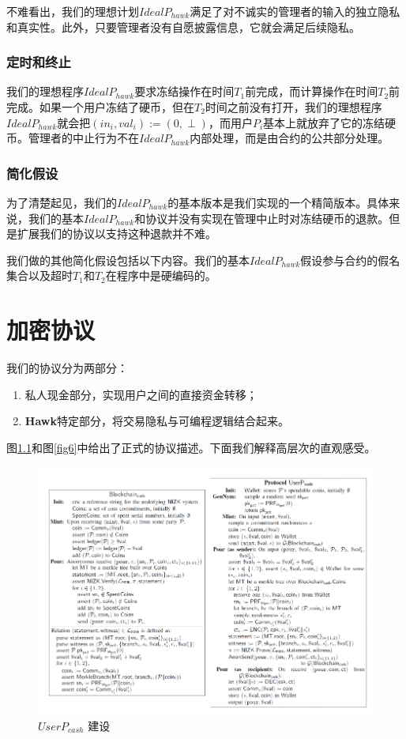 \documentclass{xduugtrans}
\begin{document}
不难看出，我们的理想计划$IdealP_{hawk}$满足了对不诚实的管理者的输入的独立隐私和真实性。此外，只要管理者没有自愿披露信息，它就会满足后续隐私。

\subsection{定时和终止}

我们的理想程序$IdealP_{hawk}$要求冻结操作在时间$T_1$前完成，而计算操作在时间$T_2$前完成。如果一个用户冻结了硬币，但在$T_2$时间之前没有打开，我们的理想程序$IdealP_{hawk}$就会把$(in_i,val_i) := (0, \perp )$，而用户$P_i$基本上就放弃了它的冻结硬币。管理者的中止行为不在$IdealP_{hawk}$内部处理，而是由合约的公共部分处理。

\subsection{简化假设}

为了清楚起见，我们的$IdealP_{hawk}$的基本版本是我们实现的一个精简版本。具体来说，我们的基本$IdealP_{hawk}$和协议并没有实现在管理中止时对冻结硬币的退款。但是扩展我们的协议以支持这种退款并不难。

我们做的其他简化假设包括以下内容。我们的基本$IdealP_{hawk}$假设参与合约的假名集合以及超时$T_1$和$T_2$在程序中是硬编码的。

\chapter{加密协议}

我们的协议分为两部分：

\begin{enumerate}
    \item 私人现金部分，实现用户之间的直接资金转移；
    \item \textbf{Hawk}特定部分，将交易隐私与可编程逻辑结合起来。
\end{enumerate}

图\ref{fig5}和图\ref{fig6}中给出了正式的协议描述。下面我们解释高层次的直观感受。

\begin{figure}
    \centering
    \includegraphics[width=.7\linewidth]{5}
    \caption{$UserP_{cash}$ 建设}
    \label{fig5}
\end{figure}
\end{document}
